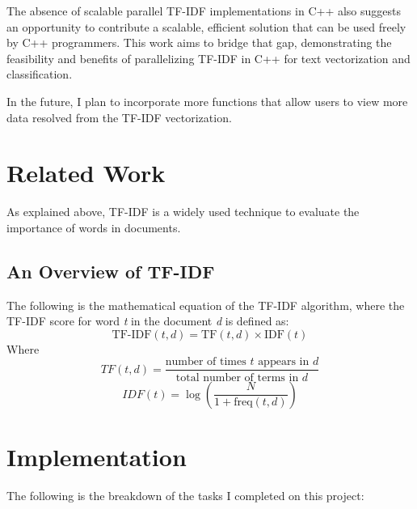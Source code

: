 \documentclass[conference]{IEEEtran}
\begin{document}
The absence of scalable parallel  TF-IDF implementations in C++ also suggests an opportunity to contribute a scalable, efficient solution that can be used freely by C++ programmers. This work aims to bridge that gap, demonstrating the feasibility and benefits of parallelizing TF-IDF in C++ for text vectorization and classification.

In the future, I plan to incorporate more functions that allow users to view more data resolved from the TF-IDF vectorization.

\section{Related Work}
As explained above, TF-IDF is a widely used technique to evaluate the importance of words in documents.

\subsection{An Overview of TF-IDF}
The following is the mathematical equation of the TF-IDF algorithm, where the TF-IDF score for word \textit{t} in the document \textit{d} is defined as:
\[
\text{TF-IDF}(t, d) = \text{TF}(t, d) \times \text{IDF}(t)
\]
Where
\[
TF(t,d) = \frac{\text{number of times } t \text{ appears in } d}{\text{total number of terms in } d}
\]
\[
IDF(t) = \log \left( \frac{N}{1 + \text{freq}(t,d)} \right)
\]

\section{Implementation}
The following is the breakdown of the tasks I completed on this project:
\end{document}
